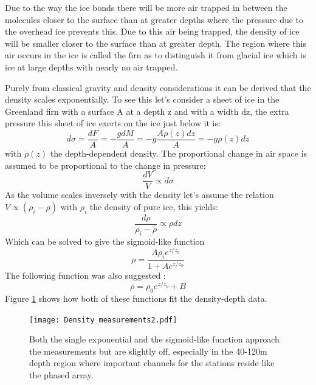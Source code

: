 Due to the way the ice bonds there will be more air trapped in between the
molecules closer to the surface than at greater depths where the pressure due
to the overhead ice prevents this.  Due to this air being trapped, the density
of ice will be smaller closer to the surface than at greater depth.  The region
where this air occurs in the ice is called the firn\cite{Firn} as to
distinguish it from glacial ice which is ice at large depths with nearly no air
trapped.

Purely from classical gravity and density considerations it can be derived that
the density scales exponentially. To see this let's consider a sheet of ice in
the Greenland firn with a surface A at a depth z and with a width dz, the extra
pressure this sheet of ice exerts on the ice just below it is:
\begin{equation}
	d\sigma = \frac{dF}{A} = -\frac{gdM}{A} = -g\frac{A\rho(z)dz}{A} = -g\rho(z)dz
\end{equation}
with $\rho(z)$ the depth-dependent density. The proportional change in air
space is assumed to be proportional to the change in
pressure\cite{herron_langway_1980}:
\begin{equation}
	\frac{dV}{V} \propto d\sigma
\end{equation}
As the volume scales inversely with the density let's assume the relation $V \propto (\rho_i - \rho)$ with
$\rho_i$ the density of pure ice, this yields:
\begin{equation}
	\frac{d\rho}{\rho_i - \rho} \propto \rho dz
\end{equation}
Which can be solved to give the sigmoid-like function
\begin{equation}
	\rho = \frac{A\rho_i e^{z/z_0}}{1 + Ae^{z/z_0}}
\end{equation}
The following function was also suggested \cite{Valte-1954}:
\begin{equation}
	\label{eqn:myderiexp}
	\rho = \rho_0 e^{z/z_0} + B
\end{equation}
Figure \ref{fig:DensityMeasurements} shows how both of these functions fit the
density-depth data\cite{alley_koci_1988}\cite{hawley_morris_mcconnell_2008}\cite{gisp}.  
\begin{figure}
  \centering
	\texttt{[image: Density\_measurements2.pdf]}
	\caption{Both the single exponential and the sigmoid-like function
	approach the measurements but are slightly off, especially in the
	40-120m depth region where important channels for the stations reside like the
	phased array.}
	\label{fig:DensityMeasurements}
\end{figure}
